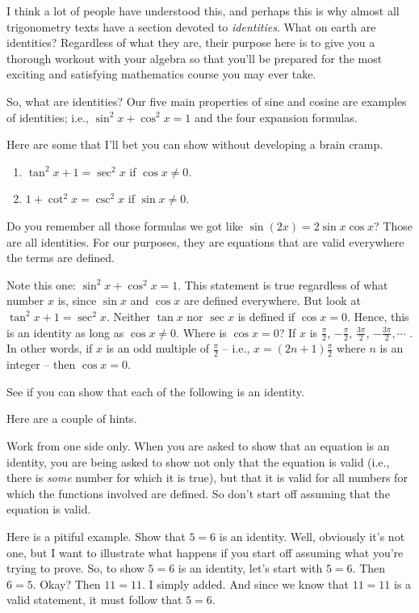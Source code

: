 \documentclass[english]{book}
\begin{document}
I think a lot of people have understood this, and perhaps this is why almost all trigonometry texts have a section devoted to \emph{identities}. What on earth are identities? Regardless of what they are, their purpose here is to give you a thorough workout with your algebra so that you'll be prepared for the most exciting and satisfying mathematics course you may ever take.

So, what are identities? Our five main properties of sine and cosine are examples of identities; i.e., $\sin^{2} x + \cos^{2} x = 1$ and the four expansion formulas.

Here are some that I'll bet you can show without developing a brain cramp.
\begin{enumerate}[\hspace{1cm}a)]
  \item $\tan^{2} x  + 1 = \sec^{2} x $ if $\cos x  \ne 0$.
  \item $1 + \cot^{2} x = \csc^{2} x $ if $\sin x  \ne 0$.
\end{enumerate}

Do you remember all those formulas we got like $\sin (2x) = 2 \sin x \cos x$? Those are all identities. For our purposes, they are equations that are valid everywhere the terms are defined. 

Note this one: $\sin^{2} x + \cos^{2} x = 1$. This statement is true regardless of what number $x$ is, since $\sin x$ and $\cos x$ are defined everywhere. But look at $\tan^{2} x  + 1 = \sec^{2} x $. Neither $\tan x$ nor $\sec x$ is defined if $\cos x = 0$. Hence, this is an identity as long as $\cos x \ne 0.$ Where is $\cos x = 0$? If $x$ is $\frac{\pi}{2}$, $-\frac{\pi}{2}$, $\frac{3 \pi}{2}$, $-\frac{3 \pi}{2}, \cdots$ . In other words, if $x$ is an odd multiple of $\frac{\pi}{2}$ -- i.e., $x = (2n + 1) \frac{\pi}{2}$ where $n$ is an integer -- then $\cos x = 0$. 

See if you can show that each of the following is an identity. 

Here are a couple of hints.

Work from one side only. When you are asked to show that an equation is an identity, you are being asked to show not only that the equation is valid (i.e., there is \emph{some} number for which it is true), but that it is valid for all numbers for which the functions
involved are defined. So don't start off assuming that the equation is valid. 

Here is a pitiful example. Show that $5 = 6$ is an identity. Well, obviously it's not one, but I want to illustrate what happens if you start off assuming what you're trying to prove. So, to show $5 = 6$ is an identity, let's start with $5 = 6$. Then $6 = 5$. Okay? Then $11 = 11$. I simply added. And since we know that $11 = 11$ is a valid statement, it must follow that $5 = 6$.
\end{document}
